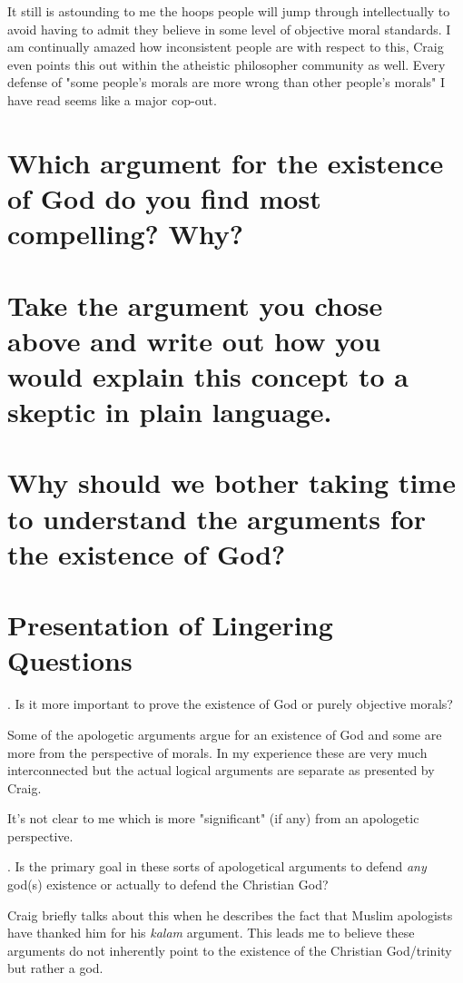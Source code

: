 \documentclass[12pt]{turabian-researchpaper}
\begin{document}
It still is astounding to me the hoops people will jump through intellectually to avoid having to admit they believe in some level of objective moral standards. I am continually amazed how inconsistent people are with respect to this, Craig even points this out within the atheistic philosopher community as well. Every defense of "some people's morals are more wrong than other people's morals" I have read seems like a major cop-out.

\section{Which argument for the existence of God do you find most compelling? Why?}


\section{Take the argument you chose above and write out how you would explain this concept to a skeptic in plain language.}



\section{Why should we bother taking time to understand the arguments for the existence of God?}

\section{Presentation of Lingering Questions}

. Is it more important to prove the existence of God or purely objective morals?

Some of the apologetic arguments argue for an existence of God and some are more from the perspective of morals. In my experience these are very much interconnected but the actual logical arguments are separate as presented by Craig.

It's not clear to me which is more "significant" (if any) from an apologetic perspective.

. Is the primary goal in these sorts of apologetical arguments to defend \textit{any} god(s) existence or actually to defend the Christian God?

Craig briefly talks about this when he describes the fact that Muslim apologists have thanked him for his \textit{kalam} argument\autocite[pg.193]{craig2008reasonable}. This leads me to believe these arguments do not inherently point to the existence of the Christian God/trinity but rather a god. 
\end{document}
